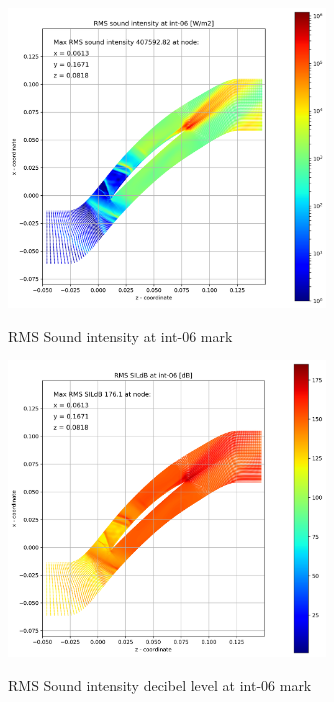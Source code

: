 \begin{figure}[ht]
  \centering
  \includegraphics[width=0.75\textwidth]{Figures/int-06-rms-sil.png} \label{int-06-rms-sil}
  \caption{RMS Sound intensity at int-06 mark}
  
  \vspace*{\floatsep}%

  \includegraphics[width=0.75\textwidth]{Figures/int-06-rms-sildb.png} \label{int-06-rms-sildb}
  \caption{RMS Sound intensity decibel level at int-06 mark}
\end{figure}


